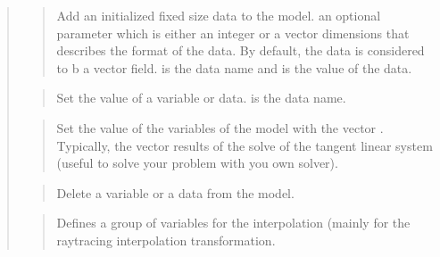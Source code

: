 \documentclass[a4paper,11pt,english]{sphinxmanual}
\begin{document}
\begin{quote}
\begin{quote}

Add an initialized fixed size data to the model.  an
optional parameter which is either an
integer  or a vector dimensions that describes the format of the
data. By default, the data is considered to b a vector field.
 is the data name and  is the value of the data.
\end{quote}

\begin{quote}

Set the value of a variable or data.  is the data name.
\end{quote}

\begin{quote}

Set the value of the variables of the model with the vector .
Typically, the vector  results of the solve of the tangent
linear system (useful to solve your problem with you own solver).
\end{quote}

\begin{quote}

Delete a variable or a data from the model.
\end{quote}

\begin{quote}

Defines a group of variables for the interpolation (mainly for the
raytracing interpolation transformation.
\end{quote}

\begin{quote}


\end{quote}
\end{quote}
\end{document}
